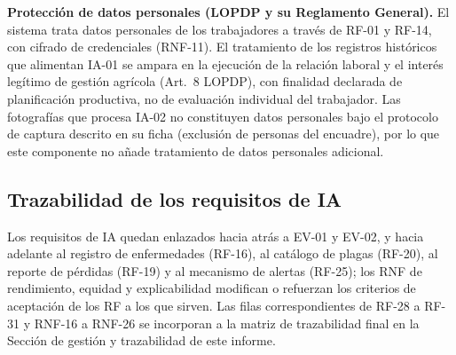 \textbf{Protección de datos personales (LOPDP y su Reglamento General).} El sistema trata datos personales de los trabajadores a través de RF-01 y RF-14, con cifrado de credenciales (RNF-11). El tratamiento de los registros históricos que alimentan IA-01 se ampara en la ejecución de la relación laboral y el interés legítimo de gestión agrícola (Art.~8 LOPDP), con finalidad declarada de planificación productiva, no de evaluación individual del trabajador. Las fotografías que procesa IA-02 no constituyen datos personales bajo el protocolo de captura descrito en su ficha (exclusión de personas del encuadre), por lo que este componente no añade tratamiento de datos personales adicional.

\subsection{Trazabilidad de los requisitos de IA}

Los requisitos de IA quedan enlazados hacia atrás a EV-01 y EV-02, y hacia adelante al registro de enfermedades (RF-16), al catálogo de plagas (RF-20), al reporte de pérdidas (RF-19) y al mecanismo de alertas (RF-25); los RNF de rendimiento, equidad y explicabilidad modifican o refuerzan los criterios de aceptación de los RF a los que sirven. Las filas correspondientes de RF-28 a RF-31 y RNF-16 a RNF-26 se incorporan a la matriz de trazabilidad final en la Sección de gestión y trazabilidad de este informe.
